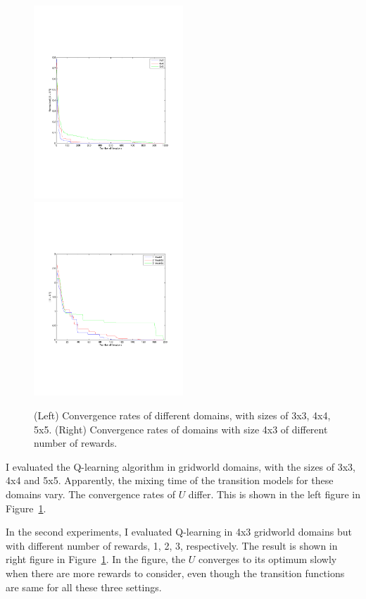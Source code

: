 \documentclass[10pt]{article}
\begin{document}
\begin{figure}[h!]
\includegraphics[width=0.5\textwidth]{exp0.pdf}
\includegraphics[width=0.5\textwidth]{experiment.pdf}
\caption{(Left) Convergence rates of different domains, with sizes of 3x3,
4x4, 5x5. (Right) Convergence rates of domains with size 4x3 of different number
of rewards.}
\label{fig:exp}
\end{figure}

I evaluated the Q-learning algorithm in gridworld domains, with the sizes of
3x3, 4x4 and 5x5. Apparently, the mixing time of the transition models for these
domains vary. The convergence rates of $U$ differ. This is shown in the left
figure in Figure~\ref{fig:exp}.

In the second experiments, I evaluated Q-learning in 4x3 gridworld domains but
with different number of rewards, 1, 2, 3, respectively. The result is shown in
right figure in Figure~\ref{fig:exp}. In the figure, the $U$ converges to its
optimum slowly when there are more rewards to consider, even though the
transition functions are same for all these three settings.
\end{document}
